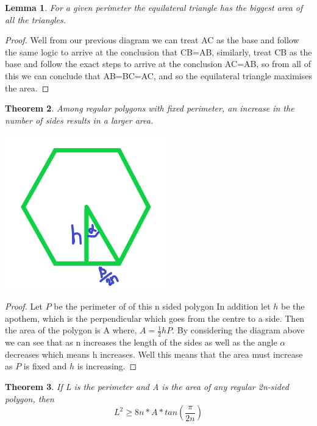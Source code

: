 \documentclass[a4paper]{book}
\newtheorem{theorem}{Theorem}%
\newtheorem{lemma}[theorem]{Lemma}%
\begin{document}
\begin{lemma}
    For a given perimeter the equilateral triangle has the biggest area of all the triangles. 
\end{lemma}
\begin{proof} 
    Well from our previous diagram we can treat AC as the base and follow the same logic to arrive at the conclusion that CB=AB, similarly, treat CB as the base and follow the exact steps to arrive at the conclusion AC=AB, so from all of this we can conclude that AB=BC=AC, and so the equilateral triangle maximises the area.
\end{proof}

\begin{theorem}
    Among regular polygons with fixed perimeter, an increase in the number of sides results in a larger area.    
\end{theorem} 

\begin{minipage}{\linewidth}
    \centering
    \includegraphics[width=7cm]{isofig10.png}
\end{minipage}
\begin{proof} 
    Let $P$ be the perimeter of of this n sided polygon In addition let $h$ be the apothem, which is the perpendicular which goes from the centre to a side. Then the area of the polygon is A where,  $A=\frac{1}{2} hP$. By considering the diagram above we can see that as n increases the length of the sides as well as the angle $\alpha$ decreases which means h increases. Well this means that the area must increase as $P$ is fixed and $h$ is increasing.
\end{proof}
\begin{theorem}   If L is the perimeter and A is the area of
any regular 2n-sided polygon, then $$L^{2} \ge 8n*A*tan(\frac{\pi}{2n})$$
\end{theorem}
\end{document}
